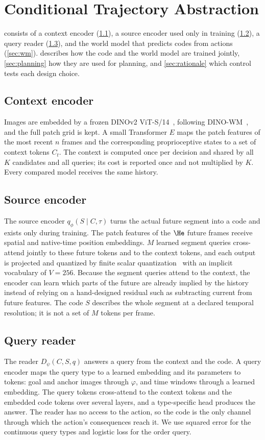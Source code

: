 \section{Conditional Trajectory Abstraction}
\label{sec:method}

\method consists of a context encoder (\cref{sec:context}), a source encoder used only in training (\cref{sec:source}), a query reader (\cref{sec:reader}), and the world model that predicts codes from actions (\cref{sec:wm}).
 describes how the code and the world model are trained jointly, \cref{sec:planning} how they are used for planning, and \cref{sec:rationale} which control tests each design choice.

\subsection{Context encoder}
\label{sec:context}
Images are embedded by a frozen DINOv2 ViT-S/14~\cite{oquab2024dinov2}, following DINO-WM~\cite{zhou2025dinowm}, and the full patch grid is kept.
A small Transformer $E$ maps the patch features of the most recent $n$ frames and the corresponding proprioceptive states to a set of context tokens $C_t$.
The context is computed once per decision and shared by all $K$ candidates and all queries; its cost is reported once and not multiplied by $K$.
Every compared model receives the same history.

\subsection{Source encoder}
\label{sec:source}
The source encoder $q_\phi(S\mid C,\tau)$ turns the actual future segment into a code and exists only during training.
The patch features of the $\He$ future frames receive spatial and native-time position embeddings.
$M$ learned segment queries cross-attend jointly to these future tokens and to the context tokens, and each output is projected and quantized by finite scalar quantization~\cite{mentzer2024fsq} with an implicit vocabulary of $V{=}256$.
Because the segment queries attend to the context, the encoder can learn which parts of the future are already implied by the history instead of relying on a hand-designed residual such as subtracting current from future features.
The code $S$ describes the whole segment at a declared temporal resolution; it is not a set of $M$ tokens per frame.

\subsection{Query reader}
\label{sec:reader}
The reader $D_\psi(C,S,q)$ answers a query from the context and the code.
A query encoder maps the query type to a learned embedding and its parameters to tokens: goal and anchor images through $\varphi$, and time windows through a learned embedding.
The query tokens cross-attend to the context tokens and the embedded code tokens over several layers, and a type-specific head produces the answer.
The reader has no access to the action, so the code is the only channel through which the action's consequences reach it.
We use squared error for the continuous query types and logistic loss for the order query.

